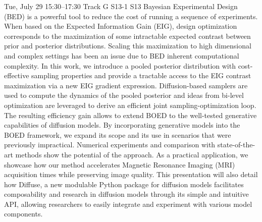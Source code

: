 \begin{talk}
  {}%
  {}%
  {}%
  {}%
  {}%
  {}%
  {Tue, July 29 15:30–17:30 Track G}%
  {S13-1}%
  {S13}%
    Bayesian  Experimental Design (BED) is a powerful tool to reduce the cost of running a sequence of experiments.
    When based on the Expected Information Gain (EIG), design optimization corresponds to the maximization of some intractable expected  contrast between prior and posterior distributions.
    Scaling this maximization to high dimensional and complex settings has been an issue due to BED inherent computational complexity.
    In this work, we introduce a pooled posterior distribution with cost-effective sampling properties and provide a tractable access to the EIG contrast maximization via a new EIG gradient expression. Diffusion-based samplers are used to compute the dynamics of the pooled posterior and ideas from bi-level optimization are leveraged to derive an efficient joint sampling-optimization loop.
    The resulting efficiency gain allows to extend BOED to the well-tested generative capabilities of diffusion models.
    By incorporating generative models into the BOED framework, we expand its scope and its use in scenarios that were previously impractical. Numerical experiments and comparison with state-of-the-art methods show the potential of the approach.
    As a practical application, we showcase how our method accelerates Magnetic Resonance Imaging (MRI) acquisition times while preserving image quality.
    This presentation will also detail how Diffuse, a new modulable Python package for diffusion models facilitates composability and research in diffusion models through its simple and intuitive API, allowing researchers to easily integrate and experiment with various model components.

\end{talk}

